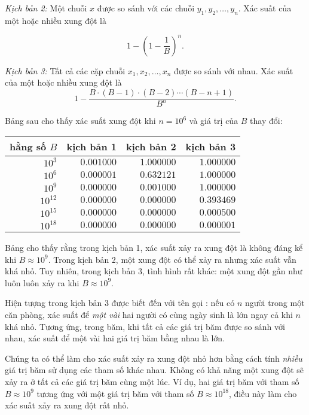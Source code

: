 \textit{Kịch bản 2:} Một chuỗi $x$ được so sánh với các chuỗi
$y_1,y_2,\ldots,y_n$.
Xác suất của một hoặc nhiều xung đột là

\[1-(1-\frac{1}{B})^n.\]

\textit{Kịch bản 3:} Tất cả các cặp chuỗi $x_1,x_2,\ldots,x_n$
được so sánh với nhau.
Xác suất của một hoặc nhiều xung đột là
\[ 1 - \frac{B \cdot (B-1) \cdot (B-2) \cdots (B-n+1)}{B^n}.\]

Bảng sau cho thấy xác suất xung đột
khi $n=10^6$ và giá trị của $B$ thay đổi:

\begin{center}
\begin{tabular}{rrrr}
hằng số $B$ & kịch bản 1 & kịch bản 2 & kịch bản 3 \\
\hline
$10^3$ & $0.001000$ & $1.000000$ & $1.000000$ \\
$10^6$ & $0.000001$ & $0.632121$ & $1.000000$ \\
$10^9$ & $0.000000$ & $0.001000$ & $1.000000$ \\
$10^{12}$ & $0.000000$ & $0.000000$ & $0.393469$ \\
$10^{15}$ & $0.000000$ & $0.000000$ & $0.000500$ \\
$10^{18}$ & $0.000000$ & $0.000000$ & $0.000001$ \\
\end{tabular}
\end{center}

Bảng cho thấy rằng trong kịch bản 1,
xác suất xảy ra xung đột là không đáng kể
khi $B \approx 10^9$.
Trong kịch bản 2, một xung đột có thể xảy ra nhưng
xác suất vẫn khá nhỏ.
Tuy nhiên, trong kịch bản 3, tình hình rất khác:
một xung đột gần như luôn luôn xảy ra khi
$B \approx 10^9$.


Hiện tượng trong kịch bản 3 được biết đến với tên gọi
: nếu có $n$ người
trong một căn phòng, xác suất để \emph{một vài} hai người
có cùng ngày sinh là lớn ngay cả khi $n$ khá nhỏ.
Tương ứng, trong băm, khi tất cả các giá trị băm được so sánh
với nhau, xác suất để một vài hai
giá trị băm bằng nhau là lớn.

Chúng ta có thể làm cho xác suất xảy ra xung đột
nhỏ hơn bằng cách tính \emph{nhiều} giá trị băm
sử dụng các tham số khác nhau.
Không có khả năng một xung đột sẽ xảy ra
ở tất cả các giá trị băm cùng một lúc.
Ví dụ, hai giá trị băm với tham số
$B \approx 10^9$ tương ứng với một giá trị
băm với tham số $B \approx 10^{18}$,
điều này làm cho xác suất xảy ra xung đột rất nhỏ.


